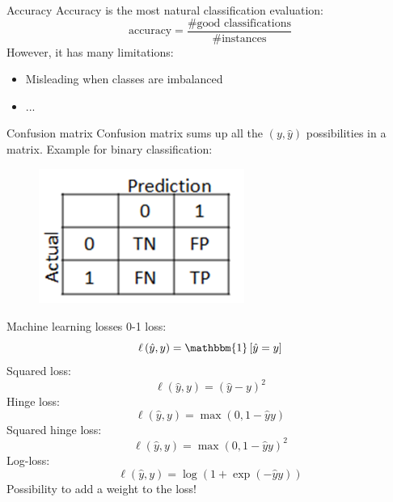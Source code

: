 \documentclass{beamer}
\newcommand{\1}[1]{\mathbbm{1}\left[#1\right]}
\begin{document}
\begin{frame}{Accuracy}
Accuracy is the most natural classification evaluation:
$$ \text{accuracy} = \dfrac{\# \text{good classifications}}{\# \text{instances}}$$
However, it has many limitations:
\begin{itemize}
	\item Misleading when classes are imbalanced
	\item ...
\end{itemize}
\end{frame}

\begin{frame}{Confusion matrix}
Confusion matrix sums up all the $(y, \hat{y})$ possibilities in a matrix. Example for binary classification:
\begin{figure}
\centering
\includegraphics[width=0.6\textwidth]{images/confusion_matrix.png}
\end{figure}
\end{frame}

\begin{frame}{Machine learning losses}
0-1 loss:
$$ \ell \left( \hat{y}, y \right) = \1{\hat{y} = y}$$
\vfill
\pause
Squared loss:
$$ \ell \left( \hat{y}, y \right) = \left( \hat{y} - y\right)^2$$
\vfill
\pause
Hinge loss:
$$ \ell \left( \hat{y}, y \right) = \max\left(0, 1 - \hat{y} y\right)$$
\vfill
\pause
Squared hinge loss:
$$ \ell \left( \hat{y}, y \right) = \max\left(0, 1 - \hat{y} y\right)^2 $$
\vfill
\pause
Log-loss:
$$ \ell \left( \hat{y}, y \right) = \log \left( 1 + \exp ( - \hat{y}y )\right) $$
\vfill
\pause
Possibility to add a weight to the loss!

\end{frame}
\end{document}
